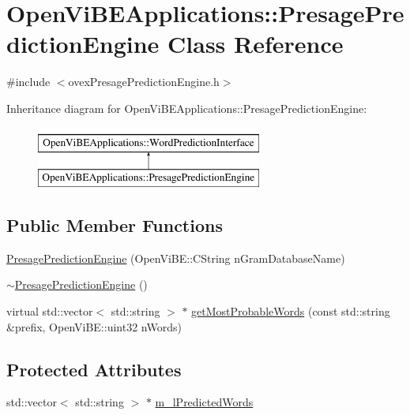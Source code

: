 \hypertarget{classOpenViBEApplications_1_1PresagePredictionEngine}{
\section{OpenViBEApplications::PresagePredictionEngine Class Reference}
\label{classOpenViBEApplications_1_1PresagePredictionEngine}
}


{\ttfamily \#include $<$ovexPresagePredictionEngine.h$>$}

Inheritance diagram for OpenViBEApplications::PresagePredictionEngine:\begin{figure}[H]
\begin{center}
\leavevmode
\includegraphics[height=2.000000cm]{classOpenViBEApplications_1_1PresagePredictionEngine}
\end{center}
\end{figure}
\subsection*{Public Member Functions}
\begin{DoxyCompactItemize}
\item 
\hyperlink{classOpenViBEApplications_1_1PresagePredictionEngine_a40c511585d4b20407cdbe25ce2f78e32}{PresagePredictionEngine} (OpenViBE::CString nGramDatabaseName)
\item 
\hyperlink{classOpenViBEApplications_1_1PresagePredictionEngine_a5dca1486e1d00776285d46228e5f12b7}{$\sim$PresagePredictionEngine} ()
\item 
virtual std::vector$<$ std::string $>$ $\ast$ \hyperlink{classOpenViBEApplications_1_1PresagePredictionEngine_ae7013ed31db4d57926c87b0858019a57}{getMostProbableWords} (const std::string \&prefix, OpenViBE::uint32 nWords)
\end{DoxyCompactItemize}
\subsection*{Protected Attributes}
\begin{DoxyCompactItemize}
\item 
std::vector$<$ std::string $>$ $\ast$ \hyperlink{classOpenViBEApplications_1_1PresagePredictionEngine_ae5f5089d4a66e00659833e526848ecf2}{m\_\-lPredictedWords}
\end{DoxyCompactItemize}


